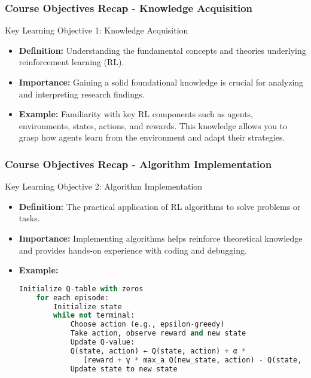 \documentclass[aspectratio=169]{beamer}
\begin{document}
\begin{frame}[fragile]
    \frametitle{Course Objectives Recap - Knowledge Acquisition}
    \begin{block}{Key Learning Objective 1: Knowledge Acquisition}
        \begin{itemize}
            \item \textbf{Definition:} Understanding the fundamental concepts and theories underlying reinforcement learning (RL).
            \item \textbf{Importance:} Gaining a solid foundational knowledge is crucial for analyzing and interpreting research findings.
            \item \textbf{Example:} Familiarity with key RL components such as agents, environments, states, actions, and rewards. This knowledge allows you to grasp how agents learn from the environment and adapt their strategies.
        \end{itemize}
    \end{block}
\end{frame}

\begin{frame}[fragile]
    \frametitle{Course Objectives Recap - Algorithm Implementation}
    \begin{block}{Key Learning Objective 2: Algorithm Implementation}
        \begin{itemize}
            \item \textbf{Definition:} The practical application of RL algorithms to solve problems or tasks.
            \item \textbf{Importance:} Implementing algorithms helps reinforce theoretical knowledge and provides hands-on experience with coding and debugging.
            \item \textbf{Example:} 
            \begin{lstlisting}[language=Python, basicstyle=\ttfamily]
    Initialize Q-table with zeros
    for each episode:
        Initialize state
        while not terminal:
            Choose action (e.g., epsilon-greedy)
            Take action, observe reward and new state
            Update Q-value:
            Q(state, action) ← Q(state, action) + α * 
               [reward + γ * max_a Q(new_state, action) - Q(state, action)]
            Update state to new state
            \end{lstlisting}
        \end{itemize}
    \end{block}
\end{frame}
\end{document}

